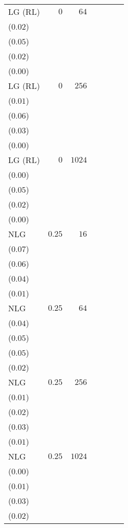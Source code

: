 \begin{table}[t]
\begin{tabular}{lrrrrrr}
LG {\scriptsize(RL)} & \(0\) & \(64\) & \longcell{\(0.88\)\\{\tiny(\(0.02\))}} & \longcell{\(0.29\)\\{\tiny(\(0.05\))}} & \longcell{\(0.05\)\\{\tiny(\(0.02\))}} & \longcell{\(0.01\)\\{\tiny(\(0.00\))}} \\[2.2ex]
LG {\scriptsize(RL)} & \(0\) & \(256\) & \longcell{\(0.95\)\\{\tiny(\(0.01\))}} & \longcell{\(0.36\)\\{\tiny(\(0.06\))}} & \longcell{\(0.07\)\\{\tiny(\(0.03\))}} & \longcell{\(0.01\)\\{\tiny(\(0.00\))}} \\[2.2ex]
LG {\scriptsize(RL)} & \(0\) & \(1024\) & \longcell{\(0.97\)\\{\tiny(\(0.00\))}} & \longcell{\(0.41\)\\{\tiny(\(0.05\))}} & \longcell{\(0.08\)\\{\tiny(\(0.02\))}} & \longcell{\(0.01\)\\{\tiny(\(0.00\))}} \\[2.2ex]
NLG & \(0.25\) & \(16\) & \longcell{\(0.55\)\\{\tiny(\(0.07\))}} & \longcell{\(0.43\)\\{\tiny(\(0.06\))}} & \longcell{\(0.27\)\\{\tiny(\(0.04\))}} & \longcell{\(0.09\)\\{\tiny(\(0.01\))}} \\[2.2ex]
NLG & \(0.25\) & \(64\) & \longcell{\(0.84\)\\{\tiny(\(0.04\))}} & \longcell{\(0.71\)\\{\tiny(\(0.05\))}} & \longcell{\(0.47\)\\{\tiny(\(0.05\))}} & \longcell{\(0.16\)\\{\tiny(\(0.02\))}} \\[2.2ex]
NLG & \(0.25\) & \(256\) & \longcell{\(0.95\)\\{\tiny(\(0.01\))}} & \longcell{\(0.87\)\\{\tiny(\(0.02\))}} & \longcell{\(0.63\)\\{\tiny(\(0.03\))}} & \longcell{\(0.24\)\\{\tiny(\(0.01\))}} \\[2.2ex]
NLG & \(0.25\) & \(1024\) & \longcell{\(0.97\)\\{\tiny(\(0.00\))}} & \longcell{\(0.92\)\\{\tiny(\(0.01\))}} & \longcell{\(0.71\)\\{\tiny(\(0.03\))}} & \longcell{\(0.29\)\\{\tiny(\(0.02\))}} \\[2.2ex]

\end{tabular}
\end{table}
